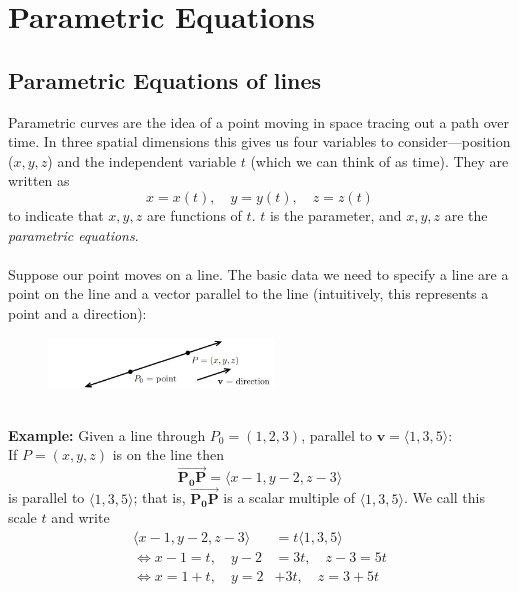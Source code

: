 \documentclass{report}
\begin{document}

\section{Parametric Equations} 
\subsection{Parametric Equations of lines} %
Parametric curves are the idea of a point moving in space tracing out a path over time. 
In three spatial dimensions this gives us four variables to consider---position 
($x,y,z$) and the independent variable $t$ (which we can think of as time). They are written as
\begin{equation*}
x=x(t),\quad y=y(t),\quad z=z(t)
\end{equation*}
to indicate that $x,y,z$ are functions of $t$. $t$ is the parameter, and $x,y,z$ 
are the \textit{parametric equations}.\\
\vspace{1mm}\\
Suppose our point moves on a line. The basic data we need to specify a line are 
a point on the line and a vector parallel to the line (intuitively, this represents a point and a direction):
\begin{figure}[h]
\includegraphics[width=6cm]{Capture87}\\
\centering
\end{figure}\\
\textbf{Example:} Given a line through $P_0=(1,2,3)$, parallel to $\mathbf{v}=\langle 1,3,5\rangle$:\\
If $P=(x,y,z)$ is on the line then
\begin{equation*}
\overrightarrow{\mathbf{P_0P}}=\langle x-1,y-2,z-3\rangle
\end{equation*}
is parallel to $\langle 1,3,5\rangle$; that is, $\overrightarrow{\mathbf{P_0P}}$ is 
a scalar multiple of $\langle 1,3,5\rangle$. We call this scale $t$ and write
\begin{align*}
\langle x-1,y-2,z-3\rangle&=t\langle 1,3,5\rangle\\
\iff x-1=t,\quad y-2&=3t,\quad z-3=5t\\
\iff x=1+t,\quad y=2&+3t,\quad z=3+5t
\end{align*}
\end{document}
